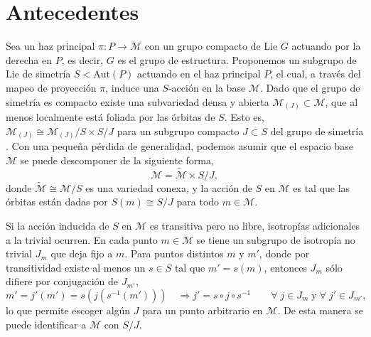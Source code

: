 \section{Antecedentes}

Sea un haz principal $\pi: P \longrightarrow \mathcal{M}$ con un grupo compacto de Lie $G$ actuando por la derecha en $P$, es decir, $G$ es el grupo de estructura. Proponemos un subgrupo de Lie de simetr\'{i}a $S < \mathrm{Aut}(P)$ actuando en el haz principal $P$, el cual, a trav\'{e}s del mapeo de proyecci\'{o}n $\pi$, induce una $S$-acci\'{o}n en la base $\mathcal{M}$. Dado que el grupo de simetr\'{i}a es compacto existe una subvariedad densa y abierta $\mathcal{M}_{(J)} \subset \mathcal{M}$, que al menos localmente est\'{a} foliada por las \'{o}rbitas de $S$. Esto es, $\mathcal{M}_{(J)} \cong  \mathcal{M}_{(J)}/S \times S/J$ para un subgrupo compacto $J \subset S$ del grupo de simetr\'{i}a \cite{Dieck}. Con una peque\~{n}a p\'{e}rdida de generalidad, podemos asumir que el espacio base $\mathcal{M}$ se puede descomponer de la siguiente forma, $$\mathcal{M} = \mathcal{\tilde{M}} \times S/J,$$ donde $\mathcal{\tilde{M}} \cong \mathcal{M}/S$ es una variedad conexa, y la acci\'{o}n de $S$ en $\mathcal{M}$ es tal que las \'{o}rbitas est\'{a}n dadas por $S(m) \cong S/J$ para todo $m \in \mathcal{M}$.

Si la acci\'{o}n inducida de $S$ en $\mathcal{M}$ es transitiva pero no libre, isotrop\'{i}as adicionales a la trivial ocurren. En cada punto $m \in \mathcal{M}$ se tiene un subgrupo de isotrop\'{i}a no trivial $J_{m}$ que deja fijo a $m$. Para puntos distintos $m$ y $m'$, donde por transitividad existe al menos un $s \in S$ tal que $m' = s(m)$, entonces $J_{m}$ s\'{o}lo difiere por conjugaci\'{o}n de $J_{m'}$,
%
\begin{equation*}
m' = j'(m') = s ( j ( s^{-1} (m') ) )  \quad \Longrightarrow j' = s \circ j \circ s^{-1} \qquad \forall \; j \in J_{m} \; \mathrm{y} \; \forall \; j' \in J_{m'},
\end{equation*}
%
lo que permite escoger alg\'{u}n $J$ para un punto arbitrario en $\mathcal{M}$. De esta manera se puede identificar a $\mathcal{M}$ con $S/J$.

